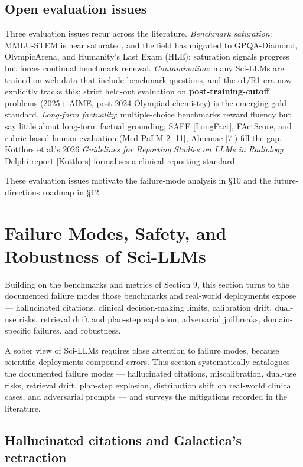 \subsection{Open evaluation issues}\label{open-evaluation-issues}

Three evaluation issues recur across the literature. \emph{Benchmark saturation}: MMLU-STEM is near saturated, and the field has migrated to GPQA-Diamond, OlympicArena, and Humanity's Last Exam (HLE); saturation signals progress but forces continual benchmark renewal. \emph{Contamination}: many Sci-LLMs are trained on web data that include benchmark questions, and the o1/R1 era now explicitly tracks this; strict held-out evaluation on \textbf{post-training-cutoff} problems (2025+ AIME, post-2024 Olympiad chemistry) is the emerging gold standard. \emph{Long-form factuality}: multiple-choice benchmarks reward fluency but say little about long-form factual grounding; SAFE {[}LongFact{]}, FActScore, and rubric-based human evaluation (Med-PaLM 2 {[}11{]}, Almanac {[}7{]}) fill the gap. Kottlors et al.'s 2026 \emph{Guidelines for Reporting Studies on LLMs in Radiology} Delphi report {[}Kottlors{]} formalises a clinical reporting standard.

These evaluation issues motivate the failure-mode analysis in §10 and the future-directions roadmap in §12.

\section{Failure Modes, Safety, and Robustness of Sci-LLMs}\label{failure-modes-safety-and-robustness-of-sci-llms}

Building on the benchmarks and metrics of Section 9, this section turns to the documented failure modes those benchmarks and real-world deployments expose --- hallucinated citations, clinical decision-making limits, calibration drift, dual-use risks, retrieval drift and plan-step explosion, adversarial jailbreaks, domain-specific failures, and robustness.

A sober view of Sci-LLMs requires close attention to failure modes, because scientific deployments compound errors. This section systematically catalogues the documented failure modes --- hallucinated citations, miscalibration, dual-use risks, retrieval drift, plan-step explosion, distribution shift on real-world clinical cases, and adversarial prompts --- and surveys the mitigations recorded in the literature.

\subsection{Hallucinated citations and Galactica's retraction}\label{hallucinated-citations-and-galacticas-retraction}

